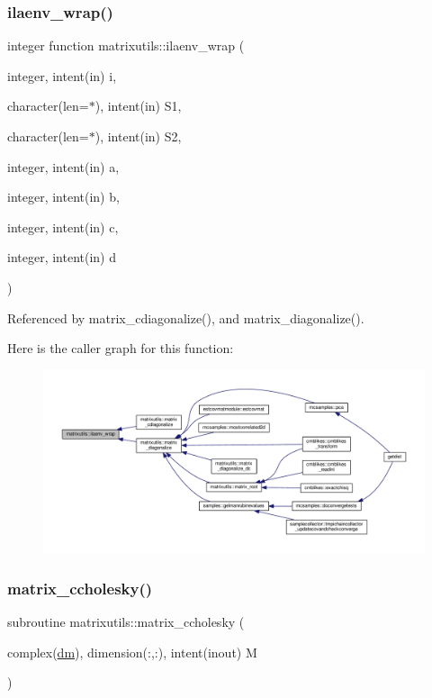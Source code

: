 \subsubsection{\texorpdfstring{ilaenv\+\_\+wrap()}{ilaenv\_wrap()}}
{\footnotesize\ttfamily integer function matrixutils\+::ilaenv\+\_\+wrap (\begin{DoxyParamCaption}\item[{integer, intent(in)}]{i,  }\item[{character(len=$\ast$), intent(in)}]{S1,  }\item[{character(len=$\ast$), intent(in)}]{S2,  }\item[{integer, intent(in)}]{a,  }\item[{integer, intent(in)}]{b,  }\item[{integer, intent(in)}]{c,  }\item[{integer, intent(in)}]{d }\end{DoxyParamCaption})}



Referenced by matrix\+\_\+cdiagonalize(), and matrix\+\_\+diagonalize().

Here is the caller graph for this function\+:
\nopagebreak
\begin{figure}[H]
\begin{center}
\leavevmode
\includegraphics[width=350pt]{namespacematrixutils_af41b3d5784e02032b5e22a16d76eca49_icgraph}
\end{center}
\end{figure}
\mbox{\label{namespacematrixutils_ad7a37503ef0aeeef3585caccc253c428}} 
\subsubsection{\texorpdfstring{matrix\+\_\+ccholesky()}{matrix\_ccholesky()}}
{\footnotesize\ttfamily subroutine matrixutils\+::matrix\+\_\+ccholesky (\begin{DoxyParamCaption}\item[{complex(\mbox{\hyperlink{namespacematrixutils_a7bdc564986ea4d90f51201c75606ef3d}{dm}}), dimension(\+:,\+:), intent(inout)}]{M }\end{DoxyParamCaption})}



